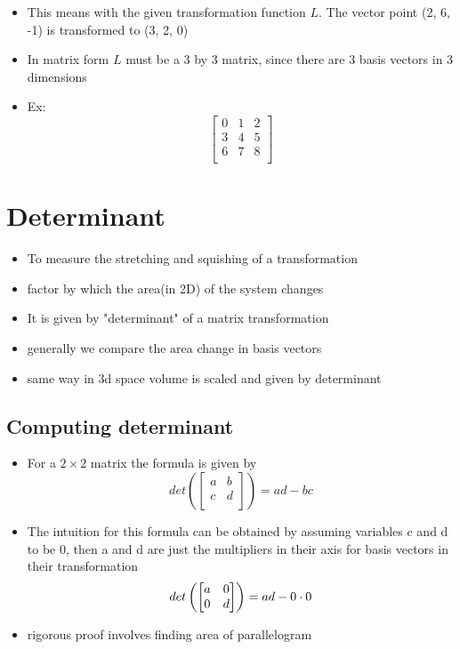 \documentclass[a4paper]{article}
\begin{document}
\begin{itemize}
	\item This means with the given transformation function
	      $L$. The vector point (2, 6, -1) is transformed
	      to (3, 2, 0)
	\item In matrix form $L$ must be a 3 by 3 matrix, since
	      there are 3 basis vectors in 3 dimensions
	\item Ex:
	      \[
		      \begin{bmatrix} 0 & 1 & 2 \\
                3 & 4 & 5 \\
                6 & 7 & 8 \\\end{bmatrix}
	      \]
\end{itemize}

\newpage
\section{Determinant}
\begin{itemize}
	\item To measure the stretching and squishing of a
	      transformation
	\item factor by which the area(in 2D) of the system
	      changes
	\item It is given by "determinant" of a matrix
	      transformation
	\item generally we compare the area change in basis
	      vectors
	\item same way in 3d space volume is scaled and given
	      by determinant
\end{itemize}

\subsection{Computing determinant}
\begin{itemize}
	\item For a $2 \times 2$ matrix the formula is given by
	      \[
		      det\left(
		      \begin{bmatrix} a & b \\
                c & d \\\end{bmatrix}  \right)
		      = a d - b c
	      \]
	\item The intuition for this formula can be
	      obtained by assuming variables c and d to be 0,
	      then a and d are just the multipliers in
	      their axis for basis vectors in their
	      transformation
	      \[
		      det\left( \begin{bmatrix}
				      a & 0 \\
				      0 & d \\\end{bmatrix}  \right)
		      = a d - 0 \cdot 0 \\
	      \]
	\item rigorous proof involves finding area of
	      parallelogram
\end{itemize}
\end{document}
